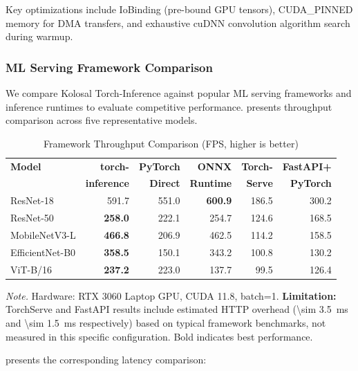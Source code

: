 \documentclass[10pt,twocolumn,a4paper]{article}
\theoremstyle{definition}
\theoremstyle{plain}
\begin{document}
Key optimizations include IoBinding (pre-bound GPU tensors), CUDA\_PINNED memory for DMA transfers, and exhaustive cuDNN convolution algorithm search during warmup.

\subsubsection{ML Serving Framework Comparison}

We compare Kolosal Torch-Inference against popular ML serving frameworks and inference runtimes to evaluate competitive performance.  presents throughput comparison across five representative models.

\begin{table}[t]
\centering
\caption{Framework Throughput Comparison (FPS, higher is better)}
\label{tab:framework_throughput}
\scriptsize
\setlength{\tabcolsep}{2.5pt}
\begin{tabular}{@{}lrrrrr@{}}
\toprule
\textbf{Model} & \textbf{torch-} & \textbf{PyTorch} & \textbf{ONNX} & \textbf{Torch-} & \textbf{FastAPI+} \\
 & \textbf{inference} & \textbf{Direct} & \textbf{Runtime} & \textbf{Serve} & \textbf{PyTorch} \\
\midrule
ResNet-18 & 591.7 & 551.0 & \textbf{600.9} & 186.5 & 300.2 \\
ResNet-50 & \textbf{258.0} & 222.1 & 254.7 & 124.6 & 168.5 \\
MobileNetV3-L & \textbf{466.8} & 206.9 & 462.5 & 114.2 & 158.5 \\
EfficientNet-B0 & \textbf{358.5} & 150.1 & 343.2 & 100.8 & 130.2 \\
ViT-B/16 & \textbf{237.2} & 223.0 & 137.7 & 99.5 & 126.4 \\
\bottomrule
\end{tabular}

\vspace{0.5em}
\noindent\textit{Note.} Hardware: RTX 3060 Laptop GPU, CUDA 11.8, batch=1. \textbf{Limitation:} TorchServe and FastAPI results include estimated HTTP overhead (\SI{\sim 3.5}{\milli\second} and \SI{\sim 1.5}{\milli\second} respectively) based on typical framework benchmarks, not measured in this specific configuration. Bold indicates best performance.
\end{table}

 presents the corresponding latency comparison:
\end{document}
